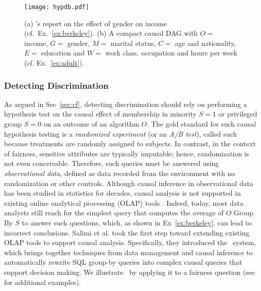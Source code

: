 \documentclass[11pt]{article}
\begin{document}
\begin{figure*} 
	\texttt{[image: hypdb.pdf]}
	\caption{(a) \hsys's report on the effect of gender on income (cf.~Ex.~\ref{ex:berkeley}).
		(b) A compact causal DAG with $O=$ income, $G=$  gender,
		$M=$ marital status, $C=$ age and nationality, $E=$ education and $W=$ work class, occupation and hours per week (cf. Ex.~\ref{ex:adult}).}
	\label{fig:cgex}
\end{figure*}
\vspace{-0.3cm}
\subsubsection{Detecting Discrimination}
\label{sec:detct}
As argued in Sec~\ref{sec:cf}, detecting discrimination should rely on performing a hypothesis
test on the causal effect of membership in minority $S=1$ or 
privileged group $S=0$ on an outcome of an algorithm $O$.
The gold standard for such causal hypothesis testing is a {\em
    randomized experiment} (or an {\em A/B test}), called such
  because treatments are randomly assigned to subjects.  In contrast, in the context of fairness, sensitive attributes are typically imputable; hence, randomization is not even conceivable. Therefore, such queries must be answered using {\em observational data}, defined as data recorded from the environment with no randomization or other controls.  Although causal inference in observational data has been studied in
statistics for decades, causal analysis is not supported in existing online analytical processing (OLAP) tools \cite{salimi2018bias}. Indeed, today, most data analysts still reach for the simplest query that computes the average of $O$ Group By $S$ to answer such questions, which, as shown in Ex~\ref{ex:berkeley}, can lead to incorrect conclusions. Salimi et al. \cite{salimi2018bias} took the first step toward extending existing OLAP tools to support causal analysis. Specifically, they introduced the \hsys\ system, which brings together techniques from data management and causal inference to automatically rewrite SQL group-by queries into complex causal queries that support decision making. We illustrate \hsys\ by applying it to a fairness question (see \cite{salimi2018hypdb} for additional examples). 
%
\end{document}

